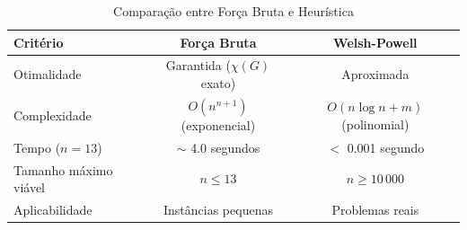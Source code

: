 \begin{table}[H]
\centering
\caption{Comparação entre Força Bruta e Heurística}
\begin{tabular}{lcc}
\toprule
\textbf{Critério} & \textbf{Força Bruta} & \textbf{Welsh-Powell} \\
\midrule
Otimalidade & Garantida ($\chi(G)$ exato) & Aproximada \\
Complexidade & $O(n^{n+1})$ (exponencial) & $O(n \log n + m)$ (polinomial) \\
Tempo ($n=13$) & $\sim$ 4.0 segundos & $<$ 0.001 segundo \\
Tamanho máximo viável & $n \leq 13$ & $n \geq 10\,000$ \\
Aplicabilidade & Instâncias pequenas & Problemas reais \\
\bottomrule
\end{tabular}
\end{table}
